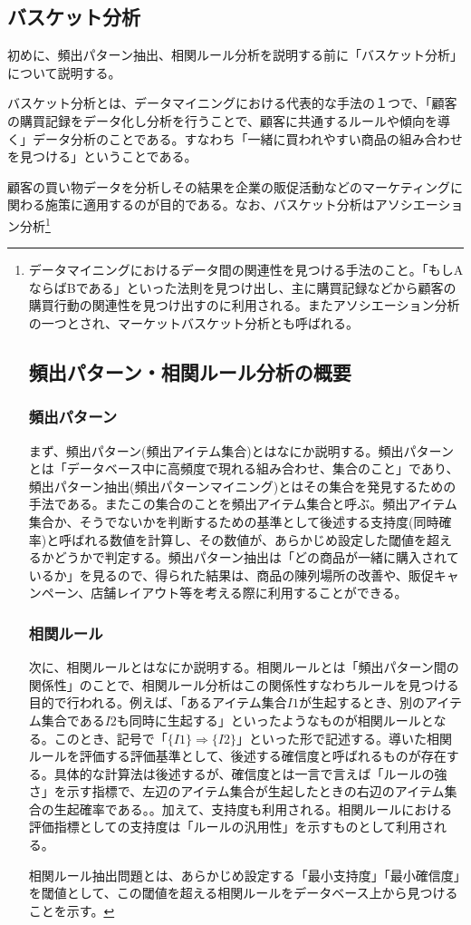 \documentclass[dvipdfmx]{jsarticle}
\begin{document}
\subsection{バスケット分析}
初めに、頻出パターン抽出、相関ルール分析を説明する前に「バスケット分析」について説明する。\par
バスケット分析とは、データマイニングにおける代表的な手法の１つで、「顧客の購買記録をデータ化し分析を行うことで、顧客に共通するルールや傾向を導く」データ分析のことである。すなわち「一緒に買われやすい商品の組み合わせを見つける」ということである。\par
顧客の買い物データを分析しその結果を企業の販促活動などのマーケティングに関わる施策に適用するのが目的である。なお、バスケット分析はアソシエーション分析\footnote{データマイニングにおけるデータ間の関連性を見つける手法のこと。「もしAならばBである」といった法則を見つけ出し、主に購買記録などから顧客の購買行動の関連性を見つけ出すのに利用される。またアソシエーション分析の一つとされ、マーケットバスケット分析とも呼ばれる。\par
\subsection{頻出パターン・相関ルール分析の概要}
\subsubsection{頻出パターン}
まず、頻出パターン(頻出アイテム集合)とはなにか説明する。頻出パターンとは「データベース中に高頻度で現れる組み合わせ、集合のこと」であり、頻出パターン抽出(頻出パターンマイニング)とはその集合を発見するための手法である。またこの集合のことを頻出アイテム集合と呼ぶ。頻出アイテム集合か、そうでないかを判断するための基準として後述する支持度(同時確率)と呼ばれる数値を計算し、その数値が、あらかじめ設定した閾値を超えるかどうかで判定する。頻出パターン抽出は「どの商品が一緒に購入されているか」を見るので、得られた結果は、商品の陳列場所の改善や、販促キャンペーン、店舗レイアウト等を考える際に利用することができる。\par
\subsubsection{相関ルール}
次に、相関ルールとはなにか説明する。相関ルールとは「頻出パターン間の関係性」のことで、相関ルール分析はこの関係性すなわちルールを見つける目的で行われる。例えば、「あるアイテム集合$I1$が生起するとき、別のアイテム集合である$I2$も同時に生起する」といったようなものが相関ルールとなる。このとき、記号で「$\{I1\} \Rightarrow \{I2\}$」といった形で記述する。導いた相関ルールを評価する評価基準として、後述する確信度と呼ばれるものが存在する。具体的な計算法は後述するが、確信度とは一言で言えば「ルールの強さ」を示す指標で、左辺のアイテム集合が生起したときの右辺のアイテム集合の生起確率である。。加えて、支持度も利用される。相関ルールにおける評価指標としての支持度は「ルールの汎用性」を示すものとして利用される。\par
相関ルール抽出問題とは、あらかじめ設定する「最小支持度」「最小確信度」を閾値として、この閾値を超える相関ルールをデータベース上から見つけることを示す。
}
\end{document}
